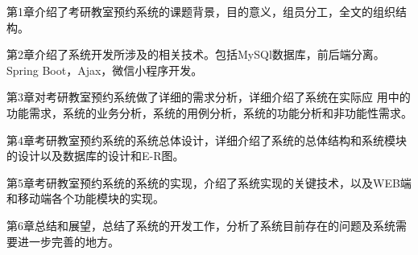 第1章介绍了考研教室预约系统的课题背景，目的意义，组员分工，全文的组织结构。

第2章介绍了系统开发所涉及的相关技术。包括MySQl数据库，前后端分离。Spring Boot，Ajax，微信小程序开发。
 
第3章对考研教室预约系统做了详细的需求分析，详细介绍了系统在实际应
用中的功能需求，系统的业务分析，系统的用例分析，系统的功能分析和非功能性需求。

第4章考研教室预约系统的系统总体设计，详细介绍了系统的总体结构和系统模块的设计以及数据库的设计和E-R图。

第5章考研教室预约系统的系统的实现，介绍了系统实现的关键技术，以及WEB端和移动端各个功能模块的实现。

第6章总结和展望，总结了系统的开发工作，分析了系统目前存在的问题及系统需要进一步完善的地方。